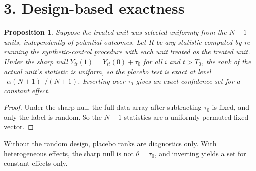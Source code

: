 \documentclass[11pt]{article}
\newtheorem{proposition}[theorem]{Proposition}
\theoremstyle{definition}
\begin{document}
\section*{3. Design-based exactness}
\begin{proposition}\label{prop:design}
Suppose the treated unit was selected uniformly from the $N+1$ units, independently of potential outcomes. Let $R$ be any
statistic computed by re-running the synthetic-control procedure with each unit treated as the treated unit. Under the
sharp null $Y_{it}(1)=Y_{it}(0)+\tau_0$ for all $i$ and $t>T_0$, the rank of the actual unit's statistic is uniform, so the
placebo test is exact at level $\lfloor\alpha(N+1)\rfloor/(N+1)$. Inverting over $\tau_0$ gives an exact confidence set
for a constant effect.
\end{proposition}
\begin{proof}
Under the sharp null, the full data array after subtracting $\tau_0$ is fixed, and only the label is random. So the
$N+1$ statistics are a uniformly permuted fixed vector.
\end{proof}
Without the random design, placebo ranks are diagnostics only. With heterogeneous effects, the sharp null is not
$\theta=\tau_0$, and inverting yields a set for constant effects only.
\end{document}
